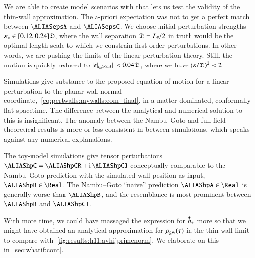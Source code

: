 







We are able to create model scenarios with \asgrd{} that lets us test the validity of the thin-wall approximation. The a-priori expectation was not to get a perfect match between $\epsA$ and $\epsC$. We choose initial perturbation strengths $\varepsilon_\ast\in[0.12, 0.24]\mathfrak{D}$, where the wall separation $\mathfrak{D}=L_\#/2$ in truth would be the optimal length scale to which we constrain first-order perturbations. 
In other words, we are pushing the limits of the linear perturbation theory. %
Still, the motion is quickly reduced to $\abs*{\varepsilon\rvert_{t_\omega >  2.3}} < 0.04 \mathfrak{D}$, where we have ${(\varepsilon/\mathfrak{D})}^2< 2$\textperthousand. 




Simulations give substance to the proposed equation of motion for a linear perturbation to the planar wall normal coordinate,~\cref{eq:pertwalls:mywalls:eom_final}, in a matter-dominated, conformally flat spacetime. The difference between the analytical and numerical solution to this is insignificant. The anomaly between the Nambu--Goto and full field-theoretical results is more or less consistent in-between simulations, which speaks against any numerical explanations.


The toy-model simulations give tensor perturbations $\hpC= \hpCR+ \im \, \hpCI $ conceptually comparable to the Nambu--Goto prediction with the simulated wall position as input, $\hpB\in \Real$. The Nambu--Goto ``naive'' prediction $\hpA\in \Real$ is generally worse than $\hpB$, and the resemblance is most prominent between $\hpB$ and $\hpCI$.



With more time, we could have massaged the expression for $\dot{\tilde{h}}_+$ more so that we might have obtained an analytical approximation for $\rho_\mathrm{gw}(\tau)$ in the thin-wall limit to compare with~\cref{fig:results:h11:avhijprimenorm}. We elaborate on this in~\cref{sec:whatif:cont}.




